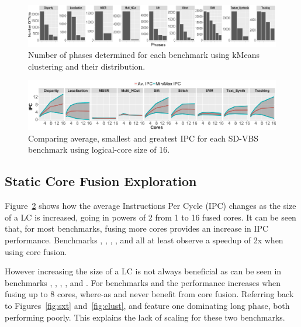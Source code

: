 \begin{figure}[t]
    \centering
    \includegraphics[width=1\textwidth]{cases-paper/graphics/Exploration/clusters2.pdf}
        \vspace*{-7mm}
    \caption{Number of phases determined for each benchmark using kMeans clustering and their distribution.}
    \label{fig:clust}
\label{some example}
\end{figure}

\begin{figure}[t]
    \centering
    \includegraphics[width=1\textwidth]{cases-paper/graphics/Exploration/stddev.pdf}
        \vspace*{-7mm}
    \caption{Comparing average, smallest and greatest IPC for each SD-VBS benchmark using logical-core size of 16.}
    \label{fig:stddev}
\vspace{5mm}
\end{figure}
\subsection{Static Core Fusion Exploration}

Figure~\ref{fig:stddev} shows how the average Instructions Per Cycle (IPC) changes as the size of a LC is increased, going in powers of 2 from 1 to 16 fused cores.
It can be seen that, for most benchmarks, fusing more cores provides an increase in IPC performance.
Benchmarks , , , ,  and  all at least observe a speedup of 2x when using core fusion.

However increasing the size of a LC is not always beneficial as can be seen in benchmarks , , , , and .
For benchmarks  and  the performance increases when fusing up to 8 cores, where-as  and  never benefit from core fusion. 
Referring back to Figures~\ref{fig:sxt} and~\ref{fig:clust},  and  feature one dominating long phase, both performing poorly.
This explains the lack of scaling for these two benchmarks.

